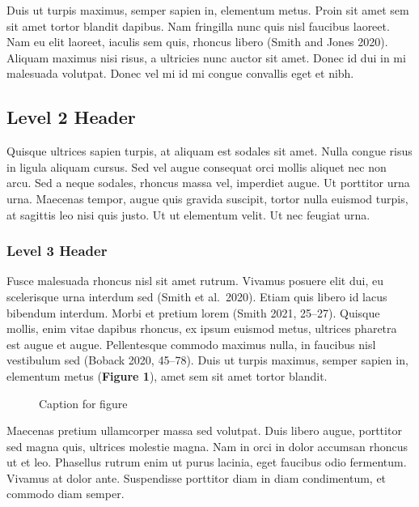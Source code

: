\documentclass[12pt,letterpaper]{article}
\begin{document}
Duis ut turpis maximus, semper sapien in, elementum metus. Proin sit amet sem sit
amet tortor blandit dapibus. Nam fringilla nunc quis nisl faucibus laoreet. Nam eu
elit laoreet, iaculis sem quis, rhoncus libero (Smith and Jones 2020). Aliquam
maximus nisi risus, a ultricies nunc auctor sit amet. Donec id dui in mi malesuada
volutpat. Donec vel mi id mi congue convallis eget et nibh.

\subsection{Level 2 Header}
Quisque ultrices sapien turpis, at aliquam est sodales sit amet. Nulla congue risus in
ligula aliquam cursus. Sed vel augue consequat orci mollis aliquet nec non arcu. Sed a
neque sodales, rhoncus massa vel, imperdiet augue. Ut porttitor urna urna. Maecenas
tempor, augue quis gravida suscipit, tortor nulla euismod turpis, at sagittis leo nisi
quis justo. Ut ut elementum velit. Ut nec feugiat urna.

\subsubsection{Level 3 Header}
Fusce malesuada rhoncus nisl sit amet rutrum. Vivamus posuere elit dui, eu scelerisque
urna interdum sed (Smith et al.\ 2020). Etiam quis libero id lacus bibendum interdum.
Morbi et pretium lorem (Smith 2021, 25--27). Quisque mollis, enim vitae dapibus
rhoncus, ex ipsum euismod metus, ultrices pharetra est augue et augue. Pellentesque
commodo maximus nulla, in faucibus nisl vestibulum sed (Boback 2020, 45--78). Duis ut
turpis maximus, semper sapien in, elementum metus (\textbf{Figure 1}), amet sem sit
amet tortor blandit.

\begin{figure}[h]
  \centering
  \caption{Caption for figure}
  \label{fig:1}
\end{figure}

Maecenas pretium ullamcorper massa sed volutpat. Duis libero augue, porttitor sed
magna quis, ultrices molestie magna. Nam in orci in dolor accumsan rhoncus ut et leo.
Phasellus rutrum enim ut purus lacinia, eget faucibus odio fermentum. Vivamus at dolor
ante. Suspendisse porttitor diam in diam condimentum, et commodo diam semper.
\end{document}
